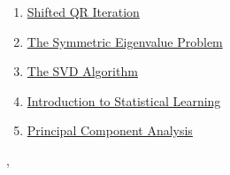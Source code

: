 \documentclass[11pt]{article}
\renewcommand{\today}{\shortmonthname[\the\month] \the \day,  \the\year}
\begin{document}
\begin{enumerate}
	\item \href{https://mp.weixin.qq.com/s/yMoWLLWmn-sPPHTGSD-5ug}{Shifted QR Iteration}	%
	\item \href{https://mp.weixin.qq.com/s/01YgGLdk9kvpX5HrV_FVCQ}{The Symmetric Eigenvalue Problem}	%
	\item \href{https://mp.weixin.qq.com/s/Rb6KL_wRl3Bdny9RjTd5bQ}{The SVD Algorithm}	%
	\item \href{https://mp.weixin.qq.com/s/SYVDiVNCUBW4mWDTk6fyyA}{Introduction to Statistical Learning}	%
	\item \href{https://mp.weixin.qq.com/s/FlSHWSKXUsgNalMqafgBgA}{Principal Component Analysis}	%
\end{enumerate}




%
\begin{flushright}
	\tiny \today 
\end{flushright}
\end{document}
